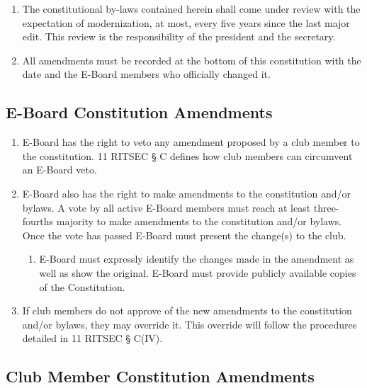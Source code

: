 \documentclass{article}
\begin{document}
\begin{enumerate}
  \item The constitutional by-laws contained herein shall come under review
    with the expectation of modernization, at most, every five years since the
    last major edit. This review is the responsibility of the president and the
    secretary.
  \item All amendments must be recorded at the bottom of this constitution with
    the date and the E-Board members who officially changed it.
\end{enumerate}

\subsection{E-Board Constitution Amendments}

\begin{enumerate}
  \item E-Board has the right to veto any amendment proposed by a club member
    to the constitution. 11 RITSEC § C defines how club members can circumvent
    an E-Board veto.
  \item E-Board also has the right to make amendments to the constitution
    and/or bylaws. A vote by all active E-Board members must reach at least
    three-fourths majority to make amendments to the constitution and/or
    bylaws. Once the vote has passed E-Board must present the change(s) to the
    club.
  \begin{enumerate}
    \item E-Board must expressly identify the changes made in the amendment as
      well as show the original. E-Board must provide publicly available copies
      of the Constitution.
  \end{enumerate}
  \item If club members do not approve of the new amendments to the
    constitution and/or bylaws, they may override it. This override will follow
    the procedures detailed in 11 RITSEC § C(IV).
\end{enumerate}

\subsection{Club Member Constitution Amendments}
\end{document}
